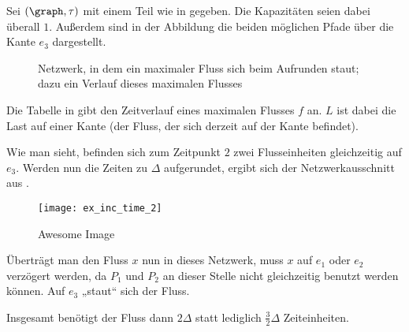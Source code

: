\begin{example}
    Sei $(\graph, \tau)$ mit einem Teil wie in  gegeben.
    Die Kapazitäten seien dabei überall $1$. Außerdem sind in der Abbildung die
    beiden möglichen Pfade über die Kante $e_3$ dargestellt.

    \newsavebox{\tempbox}
    \begin{figure}[H]
    \subfloat{\usebox{\tempbox}}%
    \qquad
      \caption{Netzwerk, in dem ein maximaler Fluss sich beim Aufrunden staut;
        dazu ein Verlauf dieses maximalen Flusses}\label{fig:ex_inc_time_1}
    \end{figure}

    Die Tabelle in  gibt den Zeitverlauf eines maximalen Flusses
    $f$ an. $L$ ist dabei die Last auf einer Kante (der Fluss, der sich
    derzeit auf der Kante befindet).

    Wie man sieht, befinden sich zum Zeitpunkt $2$ zwei Flusseinheiten gleichzeitig
    auf $e_3$. Werden nun die Zeiten zu $\Delta$ aufgerundet, ergibt sich der
    Netzwerkausschnitt aus .

    \begin{figure}[H]
    \centering
    \texttt{[image: ex\_inc\_time\_2]}
    \caption{Awesome Image}
    \label{fig:ex_inc_time_2}
    \end{figure}

     Überträgt man den Fluss $x$ nun
    in dieses Netzwerk, muss $x$ auf $e_1$ oder $e_2$ verzögert werden, da $P_1$
    und $P_2$ an dieser Stelle nicht gleichzeitig benutzt werden können.
    Auf $e_3$ „staut“ sich der Fluss.

    Insgesamt benötigt der Fluss dann $2\Delta$ statt lediglich $\frac{3}{2}\Delta$
    Zeiteinheiten.
\end{example}

